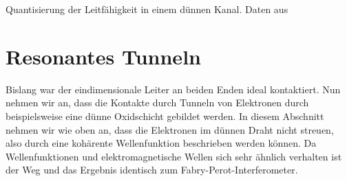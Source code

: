 \begin{marginfigure}
    \caption{Quantisierung der Leitfähigkeit in einem dünnen Kanal. Daten aus  \cite{Van_Wees1988} }
\end{marginfigure}



\section*{Resonantes Tunneln}



Bislang war der eindimensionale Leiter an beiden Enden ideal kontaktiert. Nun nehmen wir an, dass die Kontakte durch Tunneln von Elektronen durch beispielsweise eine dünne Oxidschicht gebildet werden. In diesem Abschnitt nehmen wir wie oben an, dass die Elektronen im dünnen Draht nicht streuen, also durch eine kohärente Wellenfunktion beschrieben werden können. Da Wellenfunktionen und elektromagnetische Wellen sich sehr ähnlich verhalten ist der Weg und das Ergebnis identisch zum Fabry-Perot-Interferometer.

